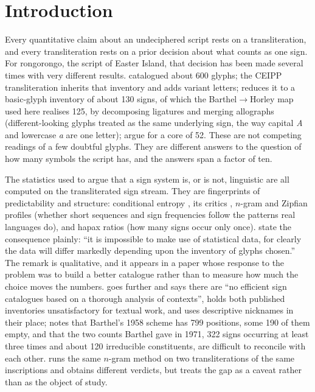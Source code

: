 \documentclass[11pt,a4paper]{article}
\begin{document}
\section{Introduction}

Every quantitative claim about an undeciphered script rests on a transliteration, and every transliteration rests on a prior decision about what counts as one sign. For rongorongo, the script of Easter Island, that decision has been made several times with very different results. \citet{barthel1958} catalogued about 600 glyphs; the CEIPP transliteration inherits that inventory and adds variant letters; \citet{horley2021} reduces it to a basic-glyph inventory of about 130 signs, of which the Barthel$\to$Horley map used here realises 125, by decomposing ligatures and merging allographs (different-looking glyphs treated as the same underlying sign, the way capital \emph{A} and lowercase \emph{a} are one letter); \citet{pozdniakov2007} argue for a core of 52. These are not competing readings of a few doubtful glyphs. They are different answers to the question of how many symbols the script has, and the answers span a factor of ten.

The statistics used to argue that a sign system is, or is not, linguistic are all computed on the transliterated sign stream. They are fingerprints of predictability and structure: conditional entropy \citep{rao2009,rao2010reply}, its critics \citep{sproat2010,sproat2014}, $n$-gram and Zipfian profiles (whether short sequences and sign frequencies follow the patterns real languages do), and hapax ratios (how many signs occur only once). \citet{pozdniakov2007} state the consequence plainly: ``it is impossible to make use of statistical data, for clearly the data will differ markedly depending upon the inventory of glyphs chosen.'' The remark is qualitative, and it appears in a paper whose response to the problem was to build a better catalogue rather than to measure how much the choice moves the numbers. \citet{davletshin2012} goes further and says there are ``no efficient sign catalogues based on a thorough analysis of contexts'', holds both published inventories unsatisfactory for textual work, and uses descriptive nicknames in their place; \citet{davletshin2017} notes that Barthel's 1958 scheme has 799 positions, some 190 of them empty, and that the two counts Barthel gave in 1971, 322 signs occurring at least three times and about 120 irreducible constituents, are difficult to reconcile with each other. \citet{korovina2026} runs the same $n$-gram method on two transliterations of the same inscriptions and obtains different verdicts, but treats the gap as a caveat rather than as the object of study.
\end{document}
